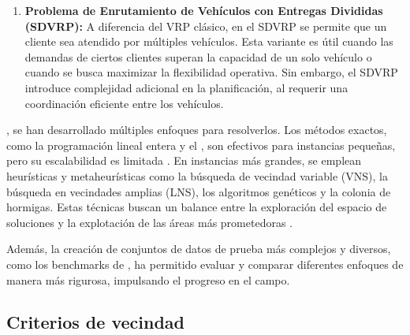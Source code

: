 \documentclass[12pt]{article}
\begin{document}
\begin{enumerate}

\item
\textbf{Problema de Enrutamiento de Vehículos con Entregas Divididas (SDVRP):}
A diferencia del VRP clásico, en el SDVRP se permite que un cliente sea atendido por múltiples vehículos. Esta variante es útil cuando las demandas de ciertos clientes superan la capacidad de un solo vehículo o cuando se busca maximizar la flexibilidad operativa. Sin embargo, el SDVRP introduce complejidad adicional en la planificación, al requerir una coordinación eficiente entre los vehículos.
\end{enumerate}

, se han desarrollado múltiples enfoques para resolverlos. Los métodos exactos, como la programación lineal entera y el , son efectivos para instancias pequeñas, pero su escalabilidad es limitada \cite{ref5}. En instancias más grandes, se emplean heurísticas y metaheurísticas como la búsqueda de vecindad variable (VNS), la búsqueda en vecindades amplias (LNS)\cite{ref4}, los algoritmos genéticos y la colonia de hormigas. Estas técnicas buscan un balance entre la exploración del espacio de soluciones y la explotación de las áreas más prometedoras \agregaesto{[REF]}.

 Además, la creación de conjuntos de datos de prueba más complejos y diversos, como los benchmarks de \cite{ref10}, ha permitido evaluar y comparar diferentes enfoques de manera más rigurosa, impulsando el progreso en el campo.


\subsection{Criterios de vecindad}
\end{document}

